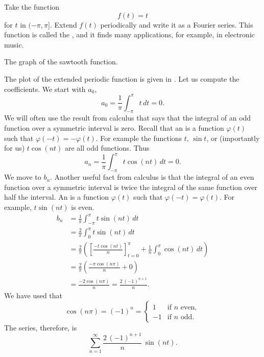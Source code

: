 \begin{example}
Take the function
\begin{equation*}
f(t) = t
\end{equation*}
for $t$ in $(-\pi,\pi]$.  Extend $f(t)$ periodically and write it 
as a Fourier series.  This function is called the
\emph{}, and it finds many applications,
for example, in electronic music.

\begin{myfig}
\capstart
{}
\caption{The graph of the sawtooth function.\label{ts:sawtoothfig}}
\end{myfig}

The plot of the extended periodic function is given in
.
Let us compute the coefficients.  We start with $a_0$,
\begin{equation*}
a_0 = \frac{1}{\pi} \int_{-\pi}^\pi t \,dt = 0 .
\end{equation*}
We will often use the result from calculus that says that the integral of an odd
function over a symmetric interval is zero.  Recall that an
\emph{} is a
function $\varphi(t)$ such that $\varphi(-t) = -\varphi(t)$.  For example
the functions $t$, $\sin t$, or (importantly for us)
$t \cos (nt)$ are all odd functions.  Thus
\begin{equation*}
a_n = \frac{1}{\pi} \int_{-\pi}^\pi t \cos (nt) \,dt = 0 .
\end{equation*}
We move to $b_n$.  Another useful fact from calculus
is that the integral of an even function over
a symmetric interval is
twice the integral of the same function over half the interval.  
An \emph{}
is a
function $\varphi(t)$ such that $\varphi(-t) = \varphi(t)$.  For example,
$t \sin (nt)$ is even.
\begin{equation*}
\begin{split}
b_n & = \frac{1}{\pi} \int_{-\pi}^\pi t \sin (nt) \,dt \\
& = \frac{2}{\pi} \int_{0}^\pi t \sin (nt) \,dt \\
& = \frac{2}{\pi} \left(
\left[ \frac{-t \cos (nt)}{n} \right]_{t=0}^{\pi}
+
\frac{1}{n}
\int_{0}^\pi \cos (nt) \,dt
\right)
\\
& = \frac{2}{\pi} \left(
\frac{-\pi \cos (n\pi)}{n}
+
0
\right) \\
& =  \frac{-2 \cos (n\pi)}{n}
=  \frac{2 \,{(-1)}^{n+1}}{n} .
\end{split}
\end{equation*}
We have used that 
\begin{equation*}
\cos (n\pi) = {(-1)}^n =
\begin{cases}
1 & \text{if } n \text{ even} , \\
-1 & \text{if } n \text{ odd} .
\end{cases}
\end{equation*}
The series, therefore, is
\begin{equation*}
\sum_{n=1}^\infty
\frac{2 \,{(-1)}^{n+1}}{n} \,
\sin (n t) .
\end{equation*}


\end{example}
